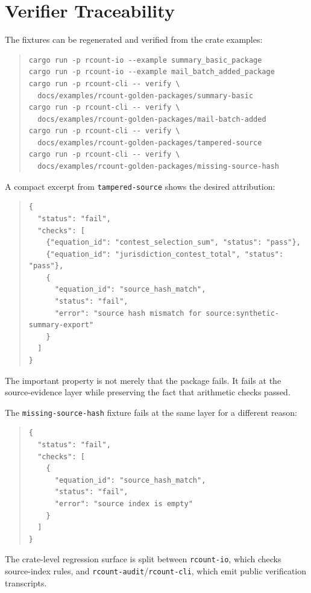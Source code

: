 \section{Verifier Traceability}

The fixtures can be regenerated and verified from the crate examples:

\begin{quote}
\footnotesize
\begin{verbatim}
cargo run -p rcount-io --example summary_basic_package
cargo run -p rcount-io --example mail_batch_added_package
cargo run -p rcount-cli -- verify \
  docs/examples/rcount-golden-packages/summary-basic
cargo run -p rcount-cli -- verify \
  docs/examples/rcount-golden-packages/mail-batch-added
cargo run -p rcount-cli -- verify \
  docs/examples/rcount-golden-packages/tampered-source
cargo run -p rcount-cli -- verify \
  docs/examples/rcount-golden-packages/missing-source-hash
\end{verbatim}
\end{quote}

A compact excerpt from \texttt{tampered-source} shows the desired attribution:
\begin{quote}
\footnotesize
\begin{verbatim}
{
  "status": "fail",
  "checks": [
    {"equation_id": "contest_selection_sum", "status": "pass"},
    {"equation_id": "jurisdiction_contest_total", "status": "pass"},
    {
      "equation_id": "source_hash_match",
      "status": "fail",
      "error": "source hash mismatch for source:synthetic-summary-export"
    }
  ]
}
\end{verbatim}
\end{quote}

The important property is not merely that the package fails. It fails at the
source-evidence layer while preserving the fact that arithmetic checks passed.

The \texttt{missing-source-hash} fixture fails at the same layer for a different
reason:
\begin{quote}
\footnotesize
\begin{verbatim}
{
  "status": "fail",
  "checks": [
    {
      "equation_id": "source_hash_match",
      "status": "fail",
      "error": "source index is empty"
    }
  ]
}
\end{verbatim}
\end{quote}

The crate-level regression surface is split between \texttt{rcount-io}, which
checks source-index rules, and \texttt{rcount-audit}/\texttt{rcount-cli}, which
emit public verification transcripts.
